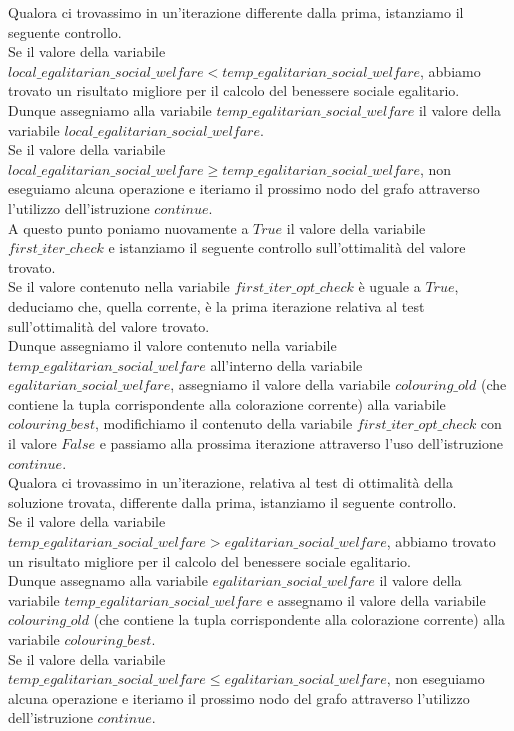 Qualora ci trovassimo in un'iterazione differente dalla prima, istanziamo il seguente controllo.\\
Se il valore della variabile \\
$local\_egalitarian\_social\_welfare < temp\_egalitarian\_social\_welfare$, abbiamo trovato un risultato migliore per il calcolo del benessere sociale egalitario.\\
Dunque assegniamo alla variabile $temp\_egalitarian\_social\_welfare$ il valore della variabile $local\_egalitarian\_social\_welfare$.\\
Se il valore della variabile \\
$local\_egalitarian\_social\_welfare \geq temp\_egalitarian\_social\_welfare$, non eseguiamo alcuna operazione e iteriamo il prossimo nodo del grafo attraverso l'utilizzo dell'istruzione $continue$.\\

A questo punto poniamo nuovamente a $True$ il valore della variabile $first\_iter\_check$ e istanziamo il seguente controllo sull'ottimalità del valore trovato.\\

Se il valore contenuto nella variabile $first\_iter\_opt\_check$ è uguale a $True$, deduciamo che, quella corrente, è la prima iterazione relativa al test sull'ottimalità del valore trovato.\\
Dunque assegniamo il valore contenuto nella variabile \\
$temp\_egalitarian\_social\_welfare$ all'interno della variabile \\
$egalitarian\_social\_welfare$, assegniamo il valore della variabile $colouring\_old$ (che contiene la tupla corrispondente alla colorazione corrente) alla variabile $colouring\_best$, modifichiamo il contenuto della variabile $first\_iter\_opt\_check$ con il valore $False$ e passiamo alla prossima iterazione attraverso l'uso dell'istruzione $continue$.\\

Qualora ci trovassimo in un'iterazione, relativa al test di ottimalità della soluzione trovata, differente dalla prima, istanziamo il seguente controllo.\\
Se il valore della variabile \\
$temp\_egalitarian\_social\_welfare > egalitarian\_social\_welfare$, abbiamo trovato un risultato migliore per il calcolo del benessere sociale egalitario.\\
Dunque assegnamo alla variabile $egalitarian\_social\_welfare$ il valore della variabile $temp\_egalitarian\_social\_welfare$ e assegnamo il valore della variabile $colouring\_old$ (che contiene la tupla corrispondente alla colorazione corrente) alla variabile $colouring\_best$.\\
Se il valore della variabile \\
$temp\_egalitarian\_social\_welfare \leq egalitarian\_social\_welfare$, non eseguiamo alcuna operazione e iteriamo il prossimo nodo del grafo attraverso l'utilizzo dell'istruzione $continue$.\\

